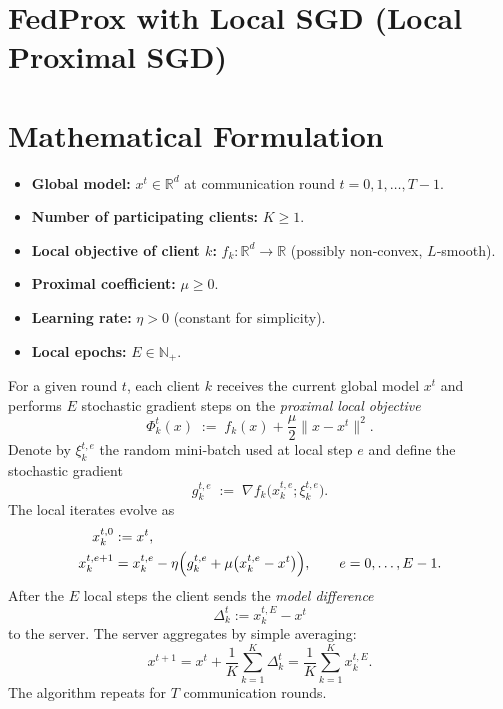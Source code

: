 \documentclass{article}
\begin{document}
\section*{FedProx with Local SGD (Local Proximal SGD)}

\section*{Mathematical Formulation}
\begin{itemize}
    \item \textbf{Global model:} $x^{t}\in\mathbb{R}^{d}$ at communication round $t=0,1,\dots,T-1$.
    \item \textbf{Number of participating clients:} $K\ge 1$.
    \item \textbf{Local objective of client $k$:} $f_k:\mathbb{R}^{d}\!\rightarrow\!\mathbb{R}$ (possibly non‑convex, $L$‑smooth).
    \item \textbf{Proximal coefficient:} $\mu\ge 0$.
    \item \textbf{Learning rate:} $\eta>0$ (constant for simplicity).
    \item \textbf{Local epochs:} $E\in\mathbb{N}_{+}$.
\end{itemize}

For a given round $t$, each client $k$ receives the current global model $x^{t}$ and performs $E$ stochastic gradient steps on the \emph{proximal local objective}
\[
\Phi_k^{t}(x)\;:=\;f_k(x)+\frac{\mu}{2}\|x-x^{t}\|^{2}.
\]
Denote by $\xi_{k}^{t,e}$ the random mini‑batch used at local step $e$ and define the stochastic gradient
\[
g_{k}^{t,e}\;:=\;\nabla f_k\!\bigl(x_{k}^{t,e};\xi_{k}^{t,e}\bigr).
\]
The local iterates evolve as
\begin{align}
x_{k}^{t,0} &:= x^{t},\nonumber\\
x_{k}^{t,e+1} &= x_{k}^{t,e}-\eta\Bigl(g_{k}^{t,e}+\mu\bigl(x_{k}^{t,e}-x^{t}\bigr)\Bigr),
\qquad e=0,\dots,E-1.\label{eq:local-update}
\end{align}
After the $E$ local steps the client sends the \emph{model difference}
\[
\Delta_{k}^{t}:=x_{k}^{t,E}-x^{t}
\]
to the server.  The server aggregates by simple averaging:
\begin{equation}
x^{t+1}=x^{t}+\frac{1}{K}\sum_{k=1}^{K}\Delta_{k}^{t}
      =\frac{1}{K}\sum_{k=1}^{K}x_{k}^{t,E}. \label{eq:server-agg}
\end{equation}
The algorithm repeats for $T$ communication rounds.
\end{document}
